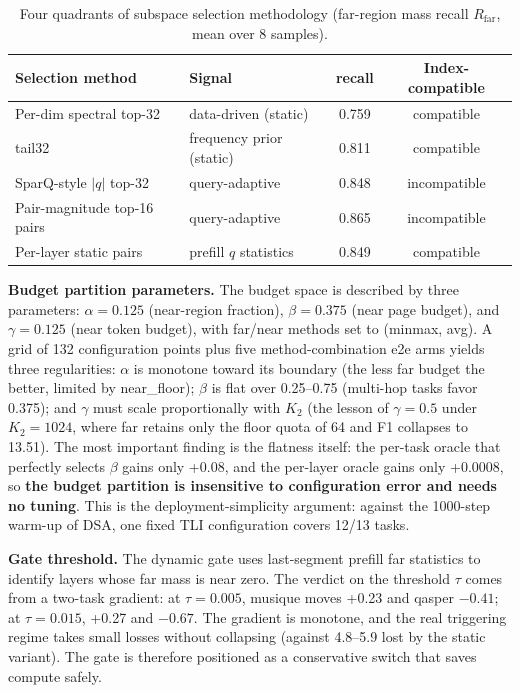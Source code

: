 \documentclass[11pt]{article}
\begin{document}
\begin{table}[h]\centering
\caption{Four quadrants of subspace selection methodology (far-region mass recall $R_{\mathrm{far}}$, mean over 8 samples).}
\label{tab:select}
\begin{tabular}{llcc}
\toprule
Selection method & Signal & recall & Index-compatible \\
\midrule
Per-dim spectral top-32 & data-driven (static) & 0.759 & compatible \\
tail32 & frequency prior (static) & 0.811 & compatible \\
SparQ-style $|q|$ top-32 & query-adaptive & 0.848 & incompatible \\
Pair-magnitude top-16 pairs & query-adaptive & 0.865 & incompatible \\
Per-layer static pairs & prefill $q$ statistics & 0.849 & compatible \\
\bottomrule
\end{tabular}
\end{table}

\textbf{Budget partition parameters.} The budget space is described by three parameters: $\alpha{=}0.125$ (near-region fraction), $\beta{=}0.375$ (near page budget), and $\gamma{=}0.125$ (near token budget), with far/near methods set to (minmax, avg). A grid of 132 configuration points plus five method-combination e2e arms yields three regularities: $\alpha$ is monotone toward its boundary (the less far budget the better, limited by near\_floor); $\beta$ is flat over 0.25--0.75 (multi-hop tasks favor 0.375); and $\gamma$ must scale proportionally with $K_2$ (the lesson of $\gamma{=}0.5$ under $K_2{=}1024$, where far retains only the floor quota of 64 and F1 collapses to 13.51). The most important finding is the flatness itself: the per-task oracle that perfectly selects $\beta$ gains only +0.08, and the per-layer oracle gains only +0.0008, so \textbf{the budget partition is insensitive to configuration error and needs no tuning}. This is the deployment-simplicity argument: against the 1000-step warm-up of DSA, one fixed TLI configuration covers 12/13 tasks.

\textbf{Gate threshold.} The dynamic gate uses last-segment prefill far statistics to identify layers whose far mass is near zero. The verdict on the threshold $\tau$ comes from a two-task gradient: at $\tau{=}0.005$, musique moves +0.23 and qasper $-0.41$; at $\tau{=}0.015$, +0.27 and $-0.67$. The gradient is monotone, and the real triggering regime takes small losses without collapsing (against 4.8--5.9 lost by the static variant). The gate is therefore positioned as a conservative switch that saves compute safely.
\end{document}
